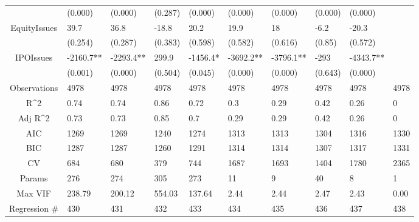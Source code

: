 \documentclass{article}
\begin{document}
\begin{table}[H]
\begin{tabular}{|clllllllll|}
   & (0.000) & (0.000) & (0.287) & (0.000) & (0.000) & (0.000) & (0.000) & (0.000) &  \\ 
  EquityIssues & 39.7 & 36.8 & -18.8 & 20.2 & 19.9 & 18 & -6.2 & -20.3 &  \\ 
   & (0.254) & (0.287) & (0.383) & (0.598) & (0.582) & (0.616) & (0.85) & (0.572) &  \\ 
  IPOIssues & -2160.7** & -2293.4** & 299.9 & -1456.4* & -3692.2** & -3796.1** & -293 & -4343.7** &  \\ 
   & (0.001) & (0.000) & (0.504) & (0.045) & (0.000) & (0.000) & (0.643) & (0.000) &  \\ 
  \hline 
 Observations & 4978 & 4978 & 4978 & 4978 & 4978 & 4978 & 4978 & 4978 & 4978 \\ 
  R^2 & 0.74 & 0.74 & 0.86 & 0.72 & 0.3 & 0.29 & 0.42 & 0.26 & 0 \\ 
  Adj R^2 & 0.73 & 0.73 & 0.85 & 0.7 & 0.29 & 0.29 & 0.42 & 0.26 & 0 \\ 
  AIC & 1269 & 1269 & 1240 & 1274 & 1313 & 1313 & 1304 & 1316 & 1330 \\ 
  BIC & 1287 & 1287 & 1260 & 1291 & 1314 & 1314 & 1307 & 1317 & 1331 \\ 
  CV & 684 & 680 & 379 & 744 & 1687 & 1693 & 1404 & 1780 & 2365 \\ 
  Params & 276 & 274 & 305 & 273 & 11 & 9 & 40 & 8 & 1 \\ 
  Max VIF & 238.79 & 200.12 & 554.03 & 137.64 & 2.44 & 2.44 & 2.47 & 2.43 & 0.00 \\ 
  Regression \# & 430 & 431 & 432 & 433 & 434 & 435 & 436 & 437 & 438 \\ 
   \hline
\end{tabular}
 
\end{table}
\end{document}
